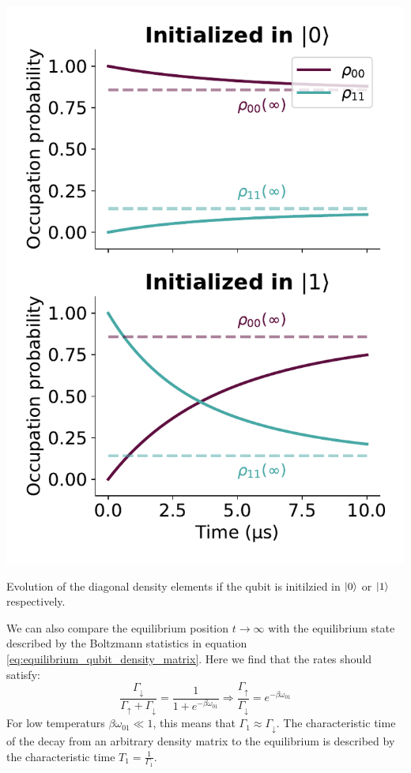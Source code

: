 \begin{marginfigure}
    \centering
    \includegraphics[]{Simulations/simulations_of_calibrations/Figs/qubit_T1_theroy.pdf}
    \caption{Evolution of the diagonal density elements if the qubit is initilzied in $\ket{0}$ or $\ket{1}$ respectively.}
    \label{fig:qubit_t1_theory}
\end{marginfigure}
We can also compare the equilibrium position $t\to\infty$ with the equilibrium state described by the Boltzmann statistics in equation \ref{eq:equilibrium_qubit_density_matrix}. Here we find that the rates should satisfy:
\begin{equation}
    \frac{\Gamma_\downarrow}{\Gamma_\uparrow + \Gamma_\downarrow} = \frac{1}{1 + e^{-\beta\omega_{01}}} \Rightarrow \frac{\Gamma_\uparrow}{\Gamma_\downarrow} =e^{-\beta\omega_{01}} 
\end{equation}
For low temperaturs $\beta \omega_{01} \ll 1$, this means that $\Gamma_1 \approx \Gamma_\downarrow$. The characteristic time of the decay from an arbitrary density matrix to the equilibrium is described by the characteristic time $T_1 = \frac{1}{\Gamma_1}$.

